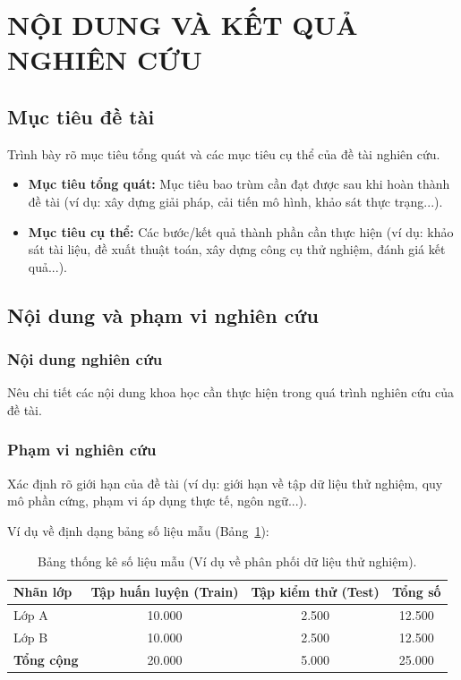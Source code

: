 \section{NỘI DUNG VÀ KẾT QUẢ NGHIÊN CỨU}

\subsection{Mục tiêu đề tài}
Trình bày rõ mục tiêu tổng quát và các mục tiêu cụ thể của đề tài nghiên cứu.
\begin{itemize}
    \item \textbf{Mục tiêu tổng quát:} Mục tiêu bao trùm cần đạt được sau khi hoàn thành đề tài (ví dụ: xây dựng giải pháp, cải tiến mô hình, khảo sát thực trạng...).
    \item \textbf{Mục tiêu cụ thể:} Các bước/kết quả thành phần cần thực hiện (ví dụ: khảo sát tài liệu, đề xuất thuật toán, xây dựng công cụ thử nghiệm, đánh giá kết quả...).
\end{itemize}

\subsection{Nội dung và phạm vi nghiên cứu}
\subsubsection{Nội dung nghiên cứu}
Nêu chi tiết các nội dung khoa học cần thực hiện trong quá trình nghiên cứu của đề tài.

\subsubsection{Phạm vi nghiên cứu}
Xác định rõ giới hạn của đề tài (ví dụ: giới hạn về tập dữ liệu thử nghiệm, quy mô phần cứng, phạm vi áp dụng thực tế, ngôn ngữ...).

Ví dụ về định dạng bảng số liệu mẫu (Bảng~\ref{tab:example-stats}):
\begin{table}[htbp]
\centering
\caption{Bảng thống kê số liệu mẫu (Ví dụ về phân phối dữ liệu thử nghiệm).}
\label{tab:example-stats}
\begin{tabular}{|l|c|c|c|}
\hline
\textbf{Nhãn lớp} & \textbf{Tập huấn luyện (Train)} & \textbf{Tập kiểm thử (Test)} & \textbf{Tổng số} \\ \hline
Lớp A & 10.000 & 2.500 & 12.500 \\ \hline
Lớp B & 10.000 & 2.500 & 12.500 \\ \hline
\textbf{Tổng cộng} & 20.000 & 5.000 & 25.000 \\ \hline
\end{tabular}
\end{table}

